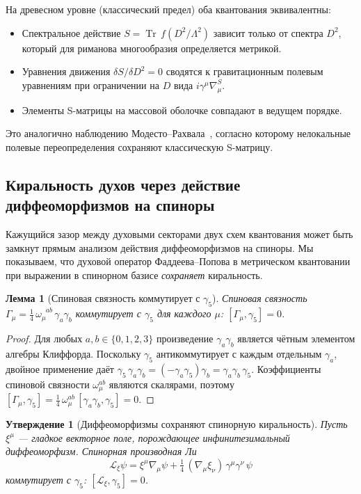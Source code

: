 \documentclass[12pt,a4paper]{article}
\newtheorem{lemma}[theorem]{Лемма}
\newtheorem{proposition}[theorem]{Утверждение}
\theoremstyle{definition}
\theoremstyle{remark}
\newcommand{\Tr}{\operatorname{Tr}}
\newcommand{\Lam}{\Lambda}
\begin{document}
На древесном уровне (классический предел) оба квантования эквивалентны:
\begin{itemize}
  \item Спектральное действие $S = \Tr\,f(D^2/\Lam^2)$ зависит только
        от спектра $D^2$, который для риманова многообразия определяется
        метрикой.
  \item Уравнения движения $\delta S / \delta D^2 = 0$ сводятся к
        гравитационным полевым уравнениям при ограничении на $D$ вида
        $i\gamma^\mu\nabla_\mu^S$.
  \item Элементы S-матрицы на массовой оболочке совпадают в ведущем
        порядке.
\end{itemize}

Это аналогично наблюдению Модесто--Рахвала~\cite{Modesto:2017sdr},
согласно которому нелокальные полевые переопределения сохраняют
классическую S-матрицу.

\subsection{Киральность духов через действие диффеоморфизмов на спиноры}
\label{sec:ghost_chirality}

Кажущийся зазор между духовыми секторами двух схем квантования может
быть замкнут прямым анализом действия диффеоморфизмов на спиноры.
Мы показываем, что духовой оператор Фаддеева--Попова в метрическом
квантовании при выражении в спинорном базисе \emph{сохраняет}
киральность.

\begin{lemma}[Спиновая связность коммутирует с $\gamma_5$]
\label{lem:spin_connection_chiral}
Спиновая связность $\Gamma_\mu = \tfrac{1}{4}\,\omega_\mu^{\phantom{\mu}ab}\,
\gamma_a\gamma_b$ коммутирует с $\gamma_5$ для каждого $\mu$:
$[\Gamma_\mu, \gamma_5] = 0$.
\end{lemma}

\begin{proof}
Для любых $a, b \in \{0,1,2,3\}$ произведение $\gamma_a\gamma_b$
является чётным элементом алгебры Клиффорда.  Поскольку $\gamma_5$
антикоммутирует с каждым отдельным $\gamma_a$, двойное применение даёт
$\gamma_5\,\gamma_a\gamma_b = (-\gamma_a\gamma_5)\gamma_b
= \gamma_a\gamma_b\,\gamma_5$.  Коэффициенты спиновой связности
$\omega_\mu^{ab}$ являются скалярами, поэтому
$[\Gamma_\mu, \gamma_5] = \tfrac{1}{4}\,\omega_\mu^{ab}\,
[\gamma_a\gamma_b, \gamma_5] = 0$.
\end{proof}

\begin{proposition}[Диффеоморфизмы сохраняют спинорную киральность]
\label{prop:diffeo_chirality}
Пусть $\xi^\mu$ --- гладкое векторное поле, порождающее
инфинитезимальный диффеоморфизм.  Спинорная производная Ли
\begin{equation}\label{eq:spinor_lie}
  \mathcal{L}_\xi\psi = \xi^\mu\nabla_\mu\psi
  + \tfrac{1}{4}\,(\nabla_\mu\xi_\nu)\,\gamma^\mu\gamma^\nu\,\psi
\end{equation}
коммутирует с $\gamma_5$: $[\mathcal{L}_\xi, \gamma_5] = 0$.
\end{proposition}
\end{document}
